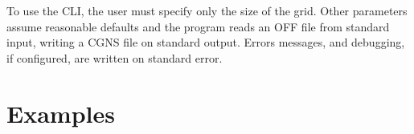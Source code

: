\documentclass[a4paper,10pt]{article}
\begin{document}
To use the CLI, the user must specify only the size of the grid. Other
parameters assume reasonable defaults and the program reads an OFF file from
standard input, writing a CGNS file on standard output. Errors messages, and
debugging, if configured, are written on standard error.

\section{Examples}





\end{document}
